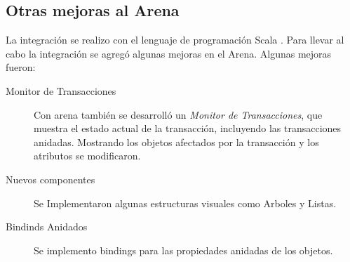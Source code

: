 	 \medskip
	 

	
	\subsection{Otras mejoras al Arena}
	La integración se realizo con el lenguaje de programación Scala
	\cite{ref}. Para llevar al cabo la integración se agregó algunas
	mejoras en el Arena. 
	Algunas mejoras fueron:
	\begin{description}
	  \item[Monitor de Transacciones]
		 Con arena también se desarrolló un \emph{Monitor de Transacciones}, que 
		 muestra el estado actual de la transacción, incluyendo las transacciones
		 anidadas. Mostrando los objetos afectados por la transacción y los
		 atributos se modificaron.
	  \item[Nuevos componentes] Se Implementaron algunas estructuras visuales como
	  Arboles y Listas.
	  \item[Bindinds Anidados] Se implemento bindings para las propiedades
	  anidadas de los objetos.
	\end{description}
